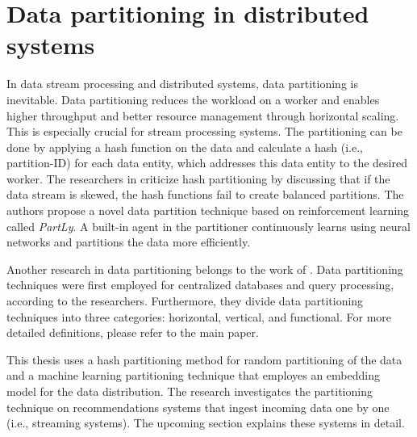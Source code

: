 \section{Data partitioning in distributed systems}
\label{sec:data-partitioning}
In data stream processing and distributed systems, data partitioning is inevitable. Data partitioning reduces the workload on a worker and enables higher throughput and better resource management through horizontal scaling. This is especially crucial for stream processing systems. The partitioning can be done by applying a hash function on the data and calculate a hash (i.e., partition-ID) for each data entity, which addresses this data entity to the desired worker. The researchers in \cite{abdelhamidPartLyLearningData2020} criticize hash partitioning by discussing that if the data stream is skewed, the hash functions fail to create balanced partitions. The authors propose a novel data partition technique based on reinforcement learning called \emph{PartLy}. A built-in agent in the partitioner continuously learns using neural networks and partitions the data more efficiently.


Another research in data partitioning belongs to the work of \cite{mahmudSurveyDataPartitioning2020}. Data partitioning techniques were first employed for centralized databases and query processing, according to the researchers. Furthermore, they divide data partitioning techniques into three categories: horizontal, vertical, and functional. For more detailed definitions, please refer to the main paper.


This thesis uses a hash partitioning method for random partitioning of the data and a machine learning partitioning technique that employes an embedding model for the data distribution. The research investigates the partitioning technique on recommendations systems that ingest incoming data one by one (i.e., streaming systems). The upcoming section explains these systems in detail.

